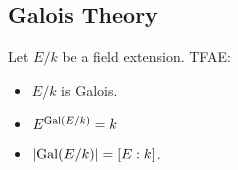 \subsection{Galois Theory}
Let $E/k$ be a field extension. TFAE:
\begin{itemize}
  \item $E/k$ is Galois.
  \item $E^{\operatorname{Gal}(E/k)} = k$
  \item $\abs{\Gal(E/k)} = [E:k]$.
\end{itemize}

%
%
%
